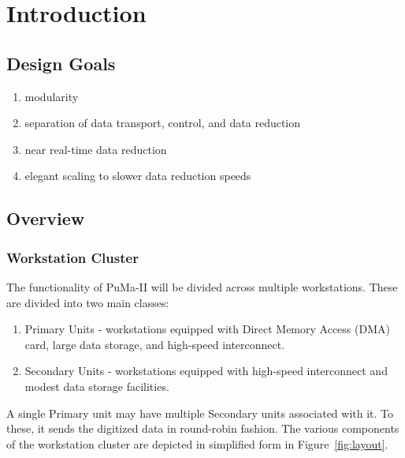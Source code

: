
\chapter{Introduction}

\section{Design Goals}

\begin{enumerate}
\item modularity
\vspace{-2mm}
\item separation of data transport, control, and data reduction
\vspace{-2mm}
\item near real-time data reduction
\vspace{-2mm}
\item elegant scaling to slower data reduction speeds
\end{enumerate}

\section{Overview}

\subsection{Workstation Cluster}

The functionality of PuMa-II will be divided across multiple workstations.
These are divided into two main classes:

\begin{enumerate}

\item Primary Units - workstations equipped with Direct Memory Access 
	(DMA) card, large data storage, and high-speed interconnect.

\item Secondary Units - workstations equipped with high-speed interconnect
	and modest data storage facilities.

\end{enumerate}

A single Primary unit may have multiple Secondary units associated
with it.  To these, it sends the digitized data in round-robin
fashion.  The various components of the workstation cluster are
depicted in simplified form in Figure~\ref{fig:layout}.

